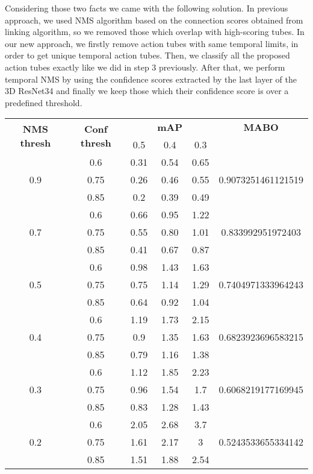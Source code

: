 Considering those two facts we came with the following solution.
In previous approach, we used NMS algorithm based on  the connection scores obtained from linking algorithm, so we removed those
which overlap with high-scoring tubes. In our new approach, we firstly remove action tubes with same temporal limits, in order to get unique
temporal action tubes. Then, we classify all the proposed action tubes exactly like we did in step 3 previously. After that, we
perform temporal NMS by using the confidence scores extracted by the last layer of the 3D ResNet34 and finally we keep those which
their confidence score is over a predefined threshold. 

\begin{center}
  \setlength{\tabcolsep}{2pt}
  \begin{longtable}{|| c | c || c c c | c ||}

    \hline
    \multirow{2}{*}{\textbf{NMS thresh}} & \multirow{2}{*}{\textbf{Conf thresh}} & {} & \textbf{mAP} & {} & \textbf{MABO} \\
    {} & {} & 0.5 & 0.4 & 0.3 & {}\\
    \hline
    \multirow{3}{*}{0.9} & {0.6} & 0.31 & 0.54 & 0.65 & \multirow{3}{*}{0.9073251461121519}\\
    \cline{2-5}
    {} & {0.75} & 0.26 & 0.46 & 0.55 & {} \\
    \cline{2-5}
    {} & {0.85} & 0.2 & 0.39 & 0.49  & {}\\
    \hline
    \multirow{3}{*}{0.7} & {0.6} & 0.66 & 0.95 & 1.22 & \multirow{3}{*}{0.833992951972403}\\
    \cline{2-5}
    {} & {0.75} & 0.55 & 0.80 & 1.01 & {}\\
    \cline{2-5}
    {} & {0.85} & 0.41 & 0.67 & 0.87 & {}\\
    \hline
    \multirow{3}{*}{0.5} & {0.6} & 0.98 & 1.43 & 1.63  & \multirow{3}{*}{0.7404971333964243}\\
    \cline{2-5}
    {} & {0.75} & 0.75 & 1.14 & 1.29 & {}\\
    \cline{2-5}
    {} & {0.85} & 0.64 & 0.92 & 1.04 & {} \\
    \hline
    \multirow{3}{*}{0.4} & {0.6} & 1.19 & 1.73 & 2.15 & \multirow{3}{*}{0.6823923696583215}\\
    \cline{2-5}
    {} & {0.75} & 0.9 & 1.35 & 1.63 & {}\\
    \cline{2-5}
    {} & {0.85} & 0.79 & 1.16 & 1.38 & {}\\

    \hline
    \multirow{3}{*}{0.3} & {0.6} & 1.12 & 1.85 & 2.23 & \multirow{3}{*}{0.6068219177169945}  \\
    \cline{2-5}
    {} & {0.75} & 0.96 & 1.54 &1.7 & {}\\
    \cline{2-5}
    {} & {0.85} & 0.83 & 1.28 & 1.43  & {}\\
    \hline                                                          
    \multirow{3}{*}{0.2} & {0.6} & 2.05 & 2.68 & 3.7 & \multirow{3}{*}{0.5243533655334142}\\
    \cline{2-5}
    {} & {0.75} & 1.61 & 2.17 & 3 & {}\\
    \cline{2-5}
    {} & {0.85} & 1.51 & 1.88 & 2.54 & {}\\


\end{longtable}
\end{center}
